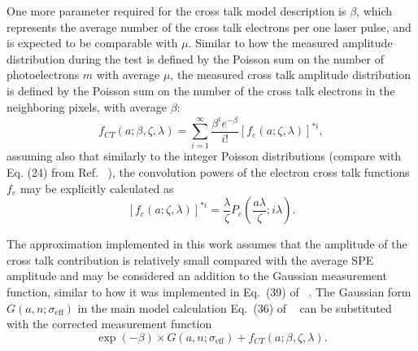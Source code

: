 One more parameter required for the cross talk model description is $\beta$, which represents the average number of the cross talk electrons per one laser pulse, and is expected to be comparable with $\mu$. Similar to how the measured amplitude distribution during the test is defined by the Poisson sum on the number of photoelectrons $m$ with average $\mu$, the measured cross talk amplitude distribution is defined by the Poisson sum on the number of the cross talk electrons in the neighboring pixels, with average $\beta$: 
\begin{equation}
\label{fCT}
 f_{CT}(a;\beta,\zeta,\lambda) = \sum\limits_{i=1}^{\infty}  \frac{\beta^{i} e^{-\beta}}{i!} \left [ f_{e}(a;\zeta,\lambda) \right ] ^{*i},
\end{equation}
assuming also that similarly to the integer Poisson distributions (compare with Eq. (24) from Ref. ~\cite{DEGTIARENKO20171}), the convolution powers of the electron cross talk functions $f_{e}$ may be explicitly calculated as  
\begin{equation}
\label{fe_cp}
 \left [ f_{e}(a;\zeta,\lambda) \right ] ^{*i} = \frac{\lambda}{\zeta} P_c \left (\frac{a \lambda}{\zeta};i\lambda \right ).
\end{equation}

The approximation implemented in this work assumes that the amplitude of the cross talk contribution is relatively small compared with the average SPE amplitude and may be considered an addition to the Gaussian measurement function, similar to how it was implemented in Eq.~(39) of ~\cite{DEGTIARENKO20171}. The Gaussian form $G(a,n;\sigma_{\mathrm{eff}})$ in the main model calculation Eq.~(36) of ~\cite{DEGTIARENKO20171} can be substituted with the corrected measurement function  
\begin{equation}
  \label{EMGform}
\exp(-\beta) \times G(a,n;\sigma_{\mathrm{eff}}) + f_{CT}(a;\beta,\zeta,\lambda) .
\end{equation}

